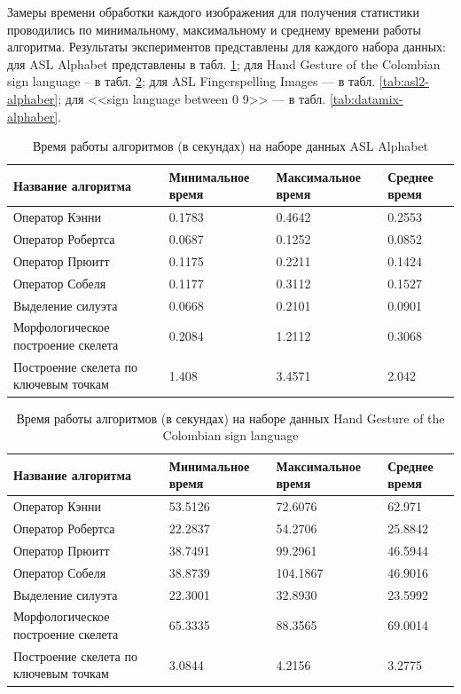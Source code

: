 Замеры времени обработки каждого изображения для получения статистики проводились по минимальному, максимальному и среднему времени работы алгоритма. Результаты экспериментов представлены для каждого набора данных: для ASL Alphabet представлены в табл. \ref{tab:asl-alphaber}; для Hand Gesture of the Colombian sign language -- в табл. \ref{tab:colombian-alphaber}; для ASL Fingerspelling Images — в табл. \ref{tab:asl2-alphaber}; для <<sign language between 0 9>> — в табл. \ref{tab:datamix-alphaber}.

\begin{table}[h]
	\caption{\label{tab:asl-alphaber}Время работы алгоритмов (в секундах) на наборе данных ASL Alphabet}
	\begin{center}
		\begin{tabular}{|p{}|p{}|p{}|p{}|}
			\hline
			Название алгоритма & Минимальное время & Максимальное время & Среднее время \\
			\hline
			Оператор Кэнни & 0.1783 & 0.4642 & 0.2553 \\
			Оператор Робертса & 0.0687 & 0.1252 & 0.0852 \\
			Оператор Прюитт & 0.1175 & 0.2211 & 0.1424  \\
			Оператор Собеля & 0.1177 & 0.3112 & 0.1527 \\
			Выделение силуэта & 0.0668 & 0.2101 & 0.0901 \\
			Морфологическое построение скелета & 0.2084 & 1.2112 & 0.3068 \\
			Построение скелета по ключевым точкам & 1.408 & 3.4571 & 2.042 \\
			\hline
		\end{tabular}
	\end{center}
\end{table}

\begin{table}[h]
	\caption{\label{tab:colombian-alphaber}Время работы алгоритмов (в секундах) на наборе данных Hand Gesture of the Colombian sign language}
	\begin{center}
		\begin{tabular}{|p{}|p{}|p{}|p{}|}
			\hline
			Название алгоритма & Минимальное время & Максимальное время & Среднее время \\
			\hline
			Оператор Кэнни & 53.5126 & 72.6076 & 62.971 \\
			Оператор Робертса & 22.2837 & 54.2706 & 25.8842 \\
			Оператор Прюитт & 38.7491 & 99.2961 & 46.5944 \\
			Оператор Собеля & 38.8739 & 104.1867 & 46.9016 \\
			Выделение силуэта & 22.3001 & 32.8930 & 23.5992 \\
			Морфологическое построение скелета & 65.3335 & 88.3565 & 69.0014 \\
			Построение скелета  по ключевым точкам & 3.0844 & 4.2156 & 3.2775 \\
			\hline
		\end{tabular}
	\end{center}
\end{table} 

